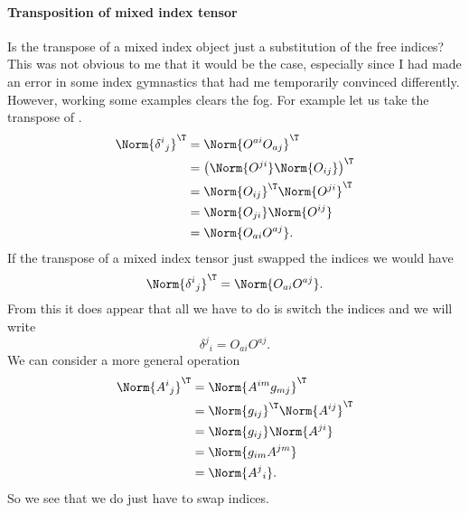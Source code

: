 \paragraph{Transposition of mixed index tensor}
%
Is the transpose of a mixed index object just a substitution of the free indices?  This was not obvious to me that it would be the case, especially since I had made an error in some index gymnastics that had me temporarily convinced differently.  However, working some examples clears the fog.  For example let us take the transpose of .
%
\begin{equation}\label{eqn:relativisticElectrodynamicsL11b:1440}
\begin{aligned}
\Norm{ {\delta^i}_j }^\T
&=
\Norm{ O^{a i} O_{a j} }^\T \\
&=
\left( \Norm{ O^{j i} } \Norm{ O_{i j} } \right)^\T \\
&=
\Norm{ O_{i j} }^\T
\Norm{ O^{j i} }^\T  \\
&=
\Norm{ O_{j i} }
\Norm{ O^{i j} } \\
&=
\Norm{ O_{a i} O^{a j} }.
\end{aligned}
\end{equation}
%
If the transpose of a mixed index tensor just swapped the indices we would have
%
\begin{equation}\label{eqn:relativisticElectrodynamicsL11:1060}
\Norm{ {\delta^i}_j }^\T = \Norm{ O_{a i} O^{a j} }.
\end{equation}
From this it does appear that all we have to do is switch the indices and we will write
\begin{equation}\label{eqn:relativisticElectrodynamicsL11:1060b}
{\delta^j}_i = O_{a i} O^{a j}.
\end{equation}
%
We can consider a more general operation
%
\begin{equation}\label{eqn:relativisticElectrodynamicsL11b:1460}
\begin{aligned}
\Norm{{A^i}_j}^\T
&=
\Norm{ A^{i m} g_{m j} }^\T \\
&=
\Norm{ g_{i j} }^\T
\Norm{ A^{i j} }^\T
 \\
&=
\Norm{ g_{i j} }
\Norm{ A^{j i} }
 \\
&=
\Norm{ g_{i m} A^{j m} }
 \\
&=
\Norm{ {A^{j}}_i }.
\end{aligned}
\end{equation}
%
So we see that we do just have to swap indices.

